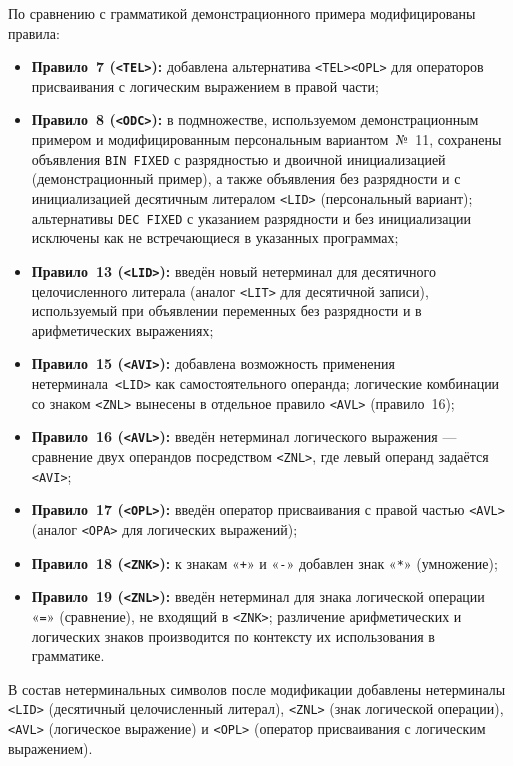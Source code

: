 \documentclass[a4paper,14pt]{extarticle}
\begin{document}
По сравнению с грамматикой демонстрационного примера модифицированы правила:
\begin{itemize}
  \item \textbf{Правило~7 (\texttt{<TEL>}):} добавлена альтернатива
        \texttt{<TEL><OPL>} для операторов присваивания с логическим выражением
        в правой части;
  \item \textbf{Правило~8 (\texttt{<ODC>}):} в подмножестве, используемом
        демонстрационным примером и модифицированным персональным вариантом~№~11,
        сохранены объявления \texttt{BIN FIXED} с разрядностью и двоичной
        инициализацией (демонстрационный пример), а также объявления без
        разрядности и с инициализацией десятичным литералом \texttt{<LID>}
        (персональный вариант); альтернативы \texttt{DEC FIXED} с указанием
        разрядности и без инициализации исключены как не встречающиеся в
        указанных программах;
  \item \textbf{Правило~13 (\texttt{<LID>}):} введён новый нетерминал
        для десятичного целочисленного литерала (аналог \texttt{<LIT>} для
        десятичной записи), используемый при объявлении переменных без
        разрядности и в арифметических выражениях;
  \item \textbf{Правило~15 (\texttt{<AVI>}):} добавлена возможность применения
        нетерминала~\texttt{<LID>} как самостоятельного операнда; логические
        комбинации со знаком \texttt{<ZNL>} вынесены в отдельное правило
        \texttt{<AVL>} (правило~16);
  \item \textbf{Правило~16 (\texttt{<AVL>}):} введён нетерминал логического
        выражения — сравнение двух операндов посредством \texttt{<ZNL>}, где
        левый операнд задаётся \texttt{<AVI>};
  \item \textbf{Правило~17 (\texttt{<OPL>}):} введён оператор присваивания
        с правой частью \texttt{<AVL>} (аналог \texttt{<OPA>} для логических
        выражений);
  \item \textbf{Правило~18 (\texttt{<ZNK>}):} к знакам «\texttt{+}» и
        «\texttt{-}» добавлен знак «\texttt{*}» (умножение);
  \item \textbf{Правило~19 (\texttt{<ZNL>}):} введён нетерминал для знака
        логической операции «\texttt{=}» (сравнение), не входящий в
        \texttt{<ZNK>}; различение арифметических и логических знаков
        производится по контексту их использования в грамматике.
\end{itemize}

В состав нетерминальных символов после модификации добавлены нетерминалы
\texttt{<LID>} (десятичный целочисленный литерал), \texttt{<ZNL>} (знак
логической операции), \texttt{<AVL>} (логическое выражение) и \texttt{<OPL>}
(оператор присваивания с логическим выражением).
\end{document}
